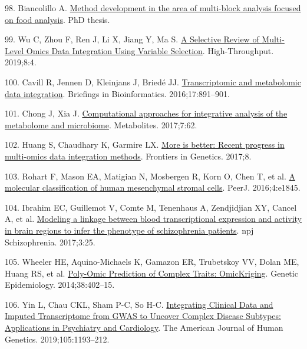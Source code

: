 \documentclass[
  12pt,
  a4paper,
  twoside,
  openright]{book}
\newlength{\cslhangindent}
\newlength{\cslentryspacingunit} %
\newenvironment{CSLReferences}[2] %
 {%
  \setlength{\parindent}{0pt}
  \ifodd #1
  \let\oldpar\par
  \def\par{\hangindent=\cslhangindent\oldpar}
  \fi
  \setlength{\parskip}{#2\cslentryspacingunit}
 }%
 {}
\begin{document}
\begin{CSLReferences}{0}{0}
\leavevmode{}%
98. Biancolillo A. \href{http://models.life.ku.dk/sites/default/files/Thesis_Alessandra_Biancolillo.pdf}{Method development in the area of multi-block analysis focused on food analysis}. PhD thesis.

\leavevmode{}%
99. Wu C, Zhou F, Ren J, Li X, Jiang Y, Ma S. \href{https://doi.org/10.3390/ht8010004}{A {Selective Review} of {Multi}-{Level Omics Data Integration Using Variable Selection}}. High-Throughput. 2019;8:4.

\leavevmode{}%
100. Cavill R, Jennen D, Kleinjans J, Briedé JJ. \href{https://doi.org/10.1093/bib/bbv090}{Transcriptomic and metabolomic data integration}. Briefings in Bioinformatics. 2016;17:891--901.

\leavevmode{}%
101. Chong J, Xia J. \href{https://doi.org/10.3390/metabo7040062}{Computational approaches for integrative analysis of the metabolome and microbiome}. Metabolites. 2017;7:62.

\leavevmode{}%
102. Huang S, Chaudhary K, Garmire LX. \href{https://doi.org/10.3389/fgene.2017.00084}{More is better: Recent progress in multi-omics data integration methods}. Frontiers in Genetics. 2017;8.

\leavevmode{}%
103. Rohart F, Mason EA, Matigian N, Mosbergen R, Korn O, Chen T, et al. \href{https://doi.org/10.7717/peerj.1845}{A molecular classification of human mesenchymal stromal cells}. PeerJ. 2016;4:e1845.

\leavevmode{}%
104. Ibrahim EC, Guillemot V, Comte M, Tenenhaus A, Zendjidjian XY, Cancel A, et al. \href{https://doi.org/10.1038/s41537-017-0027-3}{Modeling a linkage between blood transcriptional expression and activity in brain regions to infer the phenotype of schizophrenia patients}. npj Schizophrenia. 2017;3:25.

\leavevmode{}%
105. Wheeler HE, Aquino-Michaels K, Gamazon ER, Trubetskoy VV, Dolan ME, Huang RS, et al. \href{https://doi.org/10.1002/gepi.21808}{Poly-Omic Prediction of Complex Traits: OmicKriging}. Genetic Epidemiology. 2014;38:402--15.

\leavevmode{}%
106. Yin L, Chau CKL, Sham P-C, So H-C. \href{https://doi.org/10.1016/j.ajhg.2019.10.012}{Integrating Clinical Data and Imputed Transcriptome from GWAS to Uncover Complex Disease Subtypes: Applications in Psychiatry and Cardiology}. The American Journal of Human Genetics. 2019;105:1193--212.


\end{CSLReferences}
\end{document}
